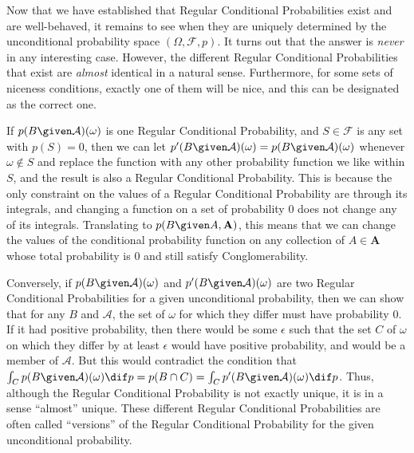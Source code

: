 Now that we have established that Regular Conditional Probabilities exist and are well-behaved, it remains to see when they are uniquely determined by the unconditional probability space $(\Omega,\mathcal{F},p)$. It turns out that the answer is \emph{never} in any interesting case. However, the different Regular Conditional Probabilities that exist are \emph{almost} identical in a natural sense. Furthermore, for some sets of niceness conditions, exactly one of them will be nice, and this can be designated as the correct one.

If $p(B \given \mathcal{A})(\omega)$ is one Regular Conditional Probability, and $S\in\mathcal{F}$ is any set with $p(S)=0$, then we can let $p'(B \given \mathcal{A})(\omega)=p(B \given \mathcal{A})(\omega)$ whenever $\omega\not\in S$ and replace the function with any other probability function we like within $S$, and the result is also a Regular Conditional Probability. This is because the only constraint on the values of a Regular Conditional Probability are through its integrals, and changing a function on a set of probability $0$ does not change any of its integrals. Translating to $p(B \given A,\mathbf{A})$, this means that we can change the values of the conditional probability function on any collection of $A\in\mathbf{A}$ whose total probability is $0$ and still satisfy Conglomerability.

Conversely, if $p(B \given \mathcal{A})(\omega)$ and $p'(B \given \mathcal{A})(\omega)$ are two Regular Conditional Probabilities for a given unconditional probability, then we can show that for any $B$ and $\mathcal{A}$, the set of $\omega$ for which they differ must have probability $0$. If it had positive probability, then there would be some $\epsilon$ such that the set $C$ of $\omega$ on which they differ by at least $\epsilon$ would have positive probability, and would be a member of $\mathcal{A}$. But this would contradict the condition that $\int_C p(B \given \mathcal{A})(\omega) \dif p=p(B\cap C)=\int_C p'(B \given \mathcal{A})(\omega) \dif p$. Thus, although the Regular Conditional Probability is not exactly unique, it is in a sense ``almost'' unique. These different Regular Conditional Probabilities are often called ``versions'' of the Regular Conditional Probability for the given unconditional probability.

